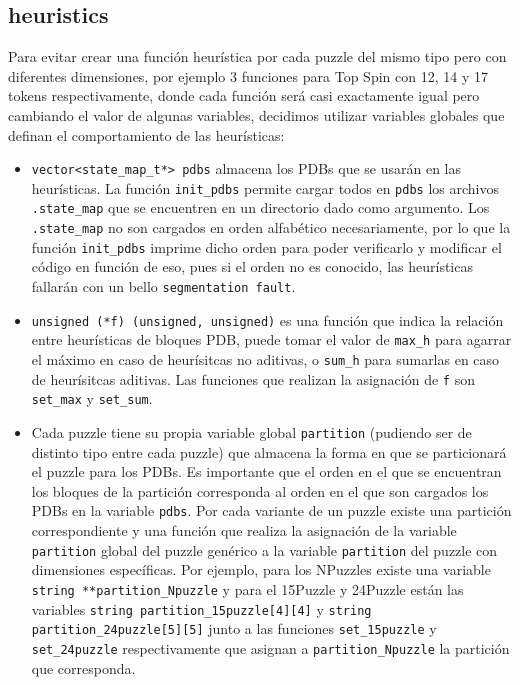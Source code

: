 \documentclass[a4paper,10pt]{article}
\begin{document}
  \subsection{heuristics}
    Para evitar crear una funci\'on heur\'istica por cada puzzle del mismo tipo pero 
    con diferentes dimensiones, por ejemplo 3 funciones para Top Spin con 12, 14 y 17 
    tokens respectivamente, donde cada funci\'on ser\'a casi exactamente igual pero 
    cambiando el valor de algunas variables, decidimos utilizar variables globales 
    que definan el comportamiento de las heur\'isticas:

    \begin{itemize}
      \item \verb|vector<state_map_t*> pdbs| almacena los PDBs que se usar\'an en las 
      heur\'isticas. La funci\'on \verb|init_pdbs| permite cargar todos en \verb|pdbs|
      los archivos \verb|.state_map| que se encuentren en un directorio dado como 
      argumento. Los \verb|.state_map| no son cargados en orden alfab\'etico 
      necesariamente, por lo que la funci\'on \verb|init_pdbs| imprime dicho orden 
      para poder verificarlo y modificar el c\'odigo en funci\'on de eso, pues si el 
      orden no es conocido, las heur\'isticas fallar\'an con un bello 
      \verb|segmentation fault|.

      \item \verb|unsigned (*f) (unsigned, unsigned)| es una funci\'on que indica la 
      relaci\'on entre heur\'isticas de bloques PDB, puede tomar el valor de 
      \verb|max_h| para agarrar el m\'aximo en caso de heur\'isitcas no aditivas, o 
      \verb|sum_h| para sumarlas en caso de heur\'isitcas aditivas. Las funciones que 
      realizan la asignaci\'on de \verb|f| son \verb|set_max| y \verb|set_sum|.

      \item Cada puzzle tiene su propia variable global \verb|partition| (pudiendo 
      ser de distinto tipo entre cada puzzle) que almacena la forma en que se 
      particionar\'a el puzzle para los PDBs. Es importante que el orden en el que 
      se encuentran los bloques de la partici\'on corresponda al orden en el que son 
      cargados los PDBs en la variable \verb|pdbs|. Por cada variante de un puzzle 
      existe una partici\'on correspondiente y una funci\'on que realiza la 
      asignaci\'on de la variable \verb|partition| global del puzzle gen\'erico a 
      la variable \verb|partition| del puzzle con dimensiones espec\'ificas. Por 
      ejemplo, para los NPuzzles existe una variable \verb|string **partition_Npuzzle|
      y para el 15Puzzle y 24Puzzle est\'an las variables 
      \verb|string partition_15puzzle[4][4]| y \verb|string partition_24puzzle[5][5]|
      junto a las funciones \verb|set_15puzzle| y \verb|set_24puzzle| respectivamente 
      que asignan a \verb|partition_Npuzzle| la partici\'on que corresponda.
    \end{itemize}
\end{document}
